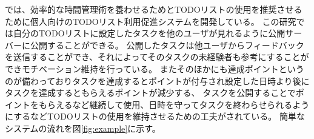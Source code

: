 \newpage
\cite{report} では、効率的な時間管理術を養わせるためとTODOリストの使用を推奨させるために個人向けのTODOリスト利用促進システムを開発している。
この研究では自分のTODOリストに設定したタスクを他のユーザが見れるように公開サーバーに公開することができる。
公開したタスクは他ユーザからフィードバックを送信することができ、それによってそのタスクの未経験者も参考にすることができモチベーション維持を行っている。
またそのほかにも達成ポイントというのが備わっておりタスクを達成するとポイントが付与され設定した日時より後にタスクを達成するともらえるポイントが減少する、
タスクを公開することでポイントをもらえるなど継続して使用、日時を守ってタスクを終わらせられるようにするなどTODOリストの使用を維持させるための工夫がされている。
簡単なシステムの流れを図\ref{fig:example}に示す。
\newpage
{}